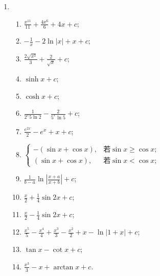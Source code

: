 % 
\begin{enumerate}
    \item %
        \begin{enumerate}[(1)]
            \item %
                $\displaystyle{
                    \frac{x^{11}}{11} + \frac{4x^6}{6} + 4x + c
                }$;
            \item %
                $\displaystyle{
                    -\frac1x - 2\ln|x| + x + c
                }$;
            \item %
                $\displaystyle{
                    \frac{2\sqrt{x^3}}{3} + \frac{2}{\sqrt{x}} + c
                }$;
            \item %
                $\sinh x + c$;
            \item %
                $\cosh x + c$;
            \item %
                $\displaystyle{
                    \frac{1}{2^x5\ln2} - \frac{2}{5^x\ln5} + c
                }$;
            \item %
                $\displaystyle{
                    \frac{e^{2x}}{2} - e^x + x + c
                }$;
            \item %
                $
                    \begin{cases}
                        -(\sin x + \cos x), & \text{若} \sin x \geqslant \cos x; \\
                        (\sin x + \cos x), & \text{若} \sin x < \cos x;
                    \end{cases}
                $
            \item %
                $\displaystyle{
                    \frac{1}{b-a}\ln\left|\frac{x+a}{x+b}\right| + c
                }$;
            \item %
                $\displaystyle{
                    \frac{x}{2} + \frac14\sin 2x + c
                }$;
            \item %
                $\displaystyle{
                    \frac{x}{2} - \frac14\sin 2x + c
                }$;
            \item %
                $\displaystyle{
                    \frac{x^5}{5} - \frac{x^4}{4} + \frac{x^3}{3} - \frac{x^2}{2} + x - \ln|1+x| + c
                }$;
            \item %
                $\tan x - \cot x + c$;
            \item %
                $\displaystyle{
                    \frac{x^3}{3} - x + \arctan x + c
                }$.
        \end{enumerate}
\end{enumerate}
% 